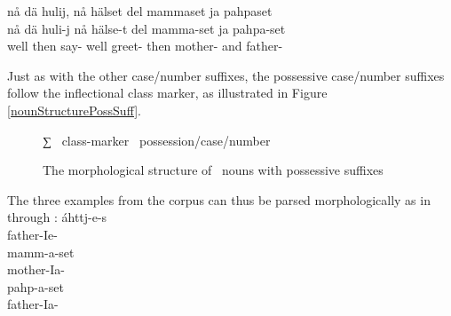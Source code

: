 \ea\label{possSuffix5}
\glll	nå dä hulij, nå hälset del mammaset ja pahpaset\\
	nå dä huli-j nå hälse-t del mamma-set ja pahpa-set\\
	well then say- well greet- then mother- and father- \\\nopagebreak
{}	
\z

Just as with the other case/number suffixes, the possessive case/number suffixes follow the inflectional class marker, as illustrated in Figure \vref{nounStructurePossSuff}. %
\begin{figure}[h]\centering
∑ \PLUS\ class-marker \PLUS\ possession/case/number%
\caption{The morphological structure of \PS\ nouns with possessive suffixes}\label{nounStructurePossSuff}
\end{figure}

The three examples from the corpus can thus be parsed morphologically as in  through :
\ea\label{possSuffixParse1}
\gll	áhttj-e-s\\
	father-Ie-\\\nopagebreak
{}
\z
\ea\label{possSuffixParse2}
\gll	mamm-a-set\\
	mother-Ia-\\\nopagebreak
{}
\z
\ea\label{possSuffixParse3}
\gll	pahp-a-set\\
	father-Ia-\\\nopagebreak
{}
\z


